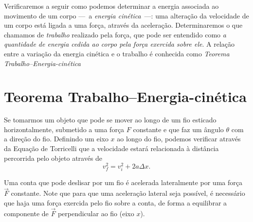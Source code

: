 Verificaremos a seguir como podemos determinar a energia associada ao movimento de um corpo ---~a \emph{energia cinética}~---: uma alteração da velocidade de um corpo está ligada a uma força, através da aceleração. Determinaremos o que chamamos de \emph{trabalho} realizado pela força, que pode ser entendido como \emph{a quantidade de energia cedida ao corpo pela força exercida sobre ele}. A relação entre a variação da energia cinética e o trabalho é conhecida como \emph{Teorema Trabalho--Energia-cinética}

\section{Teorema Trabalho--Energia-cinética}


Se tomarmos um objeto que pode se mover ao longo de um fio esticado horizontalmente, submetido a uma força $F$ constante e que faz um ângulo $\theta$ com a direção do fio. Definindo um eixo $x$ ao longo do fio, podemos verificar através da Equação de Torricelli que a velocidade estará relacionada à distância percorrida pelo objeto através de
\begin{equation}
  v_f^2 = v_i^2 + 2 a \Delta x.
\end{equation}

\begin{marginfigure}
\centering
{}
\caption{Uma conta que pode deslisar por um fio é acelerada lateralmente por uma força $\vec{F}$ constante. Note que para que uma aceleração lateral seja possível, é necessário que haja uma força exercida pelo fio sobre a conta, de forma a equilibrar a componente de $\vec{F}$ perpendicular ao fio (eixo $x$).\label{Fig:ContaAndandoNumFio}}
\end{marginfigure}

